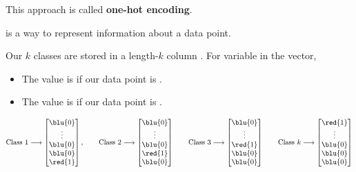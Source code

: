             This approach is called \textbf{one-hot encoding}.\\
            
            \begin{definition}
                 is a way to represent  information about a data point.
                
                Our $k$ classes are stored in a length-$k$ column . For  variable in the vector, 
                
                \begin{itemize}
                    \item The value is  if our data point is .
                    \item The value is  if our data point is .
                \end{itemize}

                 \begin{equation*}
                    \text{Class 1} \longrightarrow
                    \begin{bmatrix}
                        \blu{0} \\ \vdots \\ \blu{0} \\ \blu{0} \\ \red{1}
                    \end{bmatrix},
                    \qquad 
                    \text{Class 2} \longrightarrow
                    \begin{bmatrix}
                        \blu{0} \\ \vdots \\ \blu{0} \\ \red{1} \\ \blu{0}
                    \end{bmatrix}
                    \qquad
                    \text{Class 3} \longrightarrow
                    \begin{bmatrix}
                        \blu{0} \\ \vdots \\ \red{1} \\ \blu{0} \\ \blu{0}
                    \end{bmatrix}
                    \qquad
                    \text{Class } k \longrightarrow
                    \begin{bmatrix}
                        \red{1} \\ \vdots \\ \blu{0} \\ \blu{0} \\ \blu{0}
                    \end{bmatrix}
                \end{equation*}
                

\end{definition}
